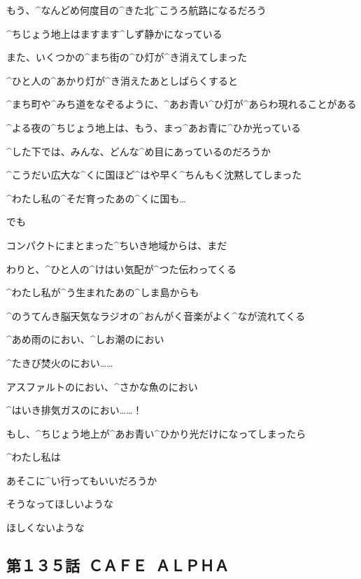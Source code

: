 \page[46]
\ASevenMOne もう、^{なんどめ}{何度目}の^{きた}{北}^{こうろ}{航路}になるだろう

\ASevenMOne ^{ちじょう}{地上}はますます^{しず}{静}かになっている

\page[47]
\ASevenMOne また、いくつかの^{まち}{街}の^{ひ}{灯}が^{き}{消}えてしまった

\ASevenMOne ^{ひと}{人}の^{あかり}{灯}が^{き}{消}えたあとしばらくすると

\ASevenMOne ^{まち}{町}や^{みち}{道}をなぞるように、^{あお}{青}い^{ひ}{灯}が^{あらわ}{現}れることがある

\page[48]
\ASevenMOne ^{よる}{夜}の^{ちじょう}{地上}は、もう、まっ^{あお}{青}に^{ひか}{光}っている

\ASevenMOne ^{した}{下}では、みんな、どんな^{め}{目}にあっているのだろうか

\page[49]
\ASevenMOne ^{こうだい}{広大}な^{くに}{国}ほど^{はや}{早}く^{ちんもく}{沈黙}してしまった

\ASevenMOne ^{わたし}{私}の^{そだ}{育}ったあの^{くに}{国}も…

\ASevenMOne でも

\ASevenMOne コンパクトにまとまった^{ちいき}{地域}からは、まだ

\ASevenMOne わりと、^{ひと}{人}の^{けはい}{気配}が^{つた}{伝}わってくる

\ASevenMOne ^{わたし}{私}が^{う}{生}まれたあの^{しま}{島}からも

\ASevenMOne ^{のうてんき}{脳天気}なラジオの^{おんがく}{音楽}がよく^{なが}{流}れてくる

\page[54]
\ASevenMOne ^{あめ}{雨}のにおい、^{しお}{潮}のにおい

\ASevenMOne ^{たきび}{焚火}のにおい……

\ASevenMOne アスファルトのにおい、^{さかな}{魚}のにおい

\ASevenMOne ^{はいき}{排気}ガスのにおい……！

\page[55]
\ASevenMOne もし、^{ちじょう}{地上}が^{あお}{青}い^{ひかり}{光}だけになってしまったら

\ASevenMOne ^{わたし}{私}は

\ASevenMOne あそこに^{い}{行}ってもいいだろうか

\ASevenMOne そうなってほしいような

\ASevenMOne ほしくないような


\subsection{第１３５話\ ＣＡＦＥ\ ＡＬＰＨＡ}


